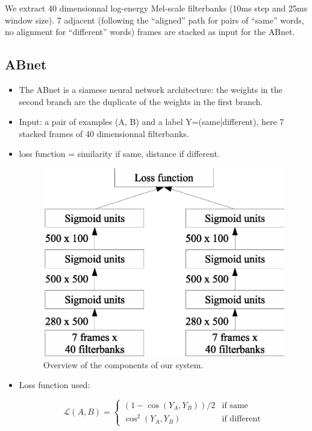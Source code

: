 \documentclass[final]{beamer}
\newcommand{\abnet}{{\sc ABnet}}
\begin{document}
\begin{frame}[t]
\begin{multicols}{3}
\begin{itemsize}
\item We extract 40 dimensionnal log-energy Mel-scale filterbanks (10ms step and 25ms window size). 7 adjacent (following the ``aligned'' path for pairs of ``same'' words, no alignment for ``different'' words) frames are stacked as input for the \abnet{}.

\subsection{ABnet}

\begin{itemize}
\item The \abnet{} is a siamese neural network architecture: the weights in the second branch are the duplicate of the weights in the first branch.
\item Input: a pair of examples (A, B) and a label Y=(same|different), here 7 stacked frames of 40 dimensionnal filterbanks.
\item loss function = similarity if same, distance if different.

\vspace{1cm}
\begin{figure}[ht!]
  \begin{center}
    \includegraphics[width=0.85\columnwidth]{abnet}
    \caption{\label{fig:system}Overview of the components of our system.}
  \end{center}
\end{figure}

\item Loss function used:

\[
\mathcal{L}(A, B) =
\begin{cases}
(1-\cos(Y_A, Y_B)) / 2 & \text{if same} \\
\cos^2(Y_A, Y_B)       & \text{if different}
\end{cases}
\]


\end{itemize}
\end{itemsize}
\end{multicols}
\end{frame}
\end{document}
